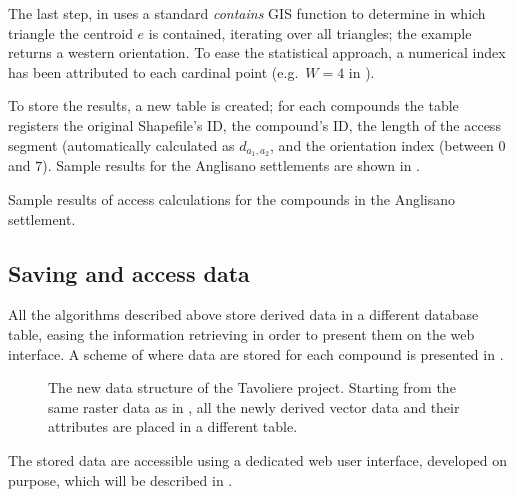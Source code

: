                 The last step, in  uses a standard \emph{contains} GIS function to determine in which triangle the centroid $e$ is contained, iterating over all triangles; the example returns a western orientation. To ease the statistical approach, a numerical index has been attributed to each cardinal point (e.g.\ $W = 4$ in ).

                To store the results, a new table is created; for each compounds the table registers the original Shapefile's ID, the compound's ID, the length of the access segment (automatically calculated as $d_{a_1, a_2}$, and the orientation index (between $0$ and $7$). Sample results for the Anglisano settlements are shown in .
                \begin{table}[!htb]
                    \centering
                    
                    \caption[Sample results of access calculations for the compounds in the Anglisano settlement.]{Sample results of access calculations for the compounds in the Anglisano settlement.}
                    \label{tab:tab-access-anglisano}
                \end{table}

        \subsection{Saving and access data}
            All the algorithms described above store derived data in a different database table, easing the information retrieving in order to present them on the web interface. A scheme of where data are stored for each compound is presented in .

            \begin{figure}[H]
                \centering
                \caption[The three diffrent tables to store compound's derived data.]{The new data structure of the Tavoliere project. Starting from the same raster data as in , all the newly derived vector data and their attributes are placed in a different table.}
                \label{fig:scheme-derive-2}
            \end{figure}

            The stored data are accessible using a dedicated web user interface, developed on purpose, which will be described in .


